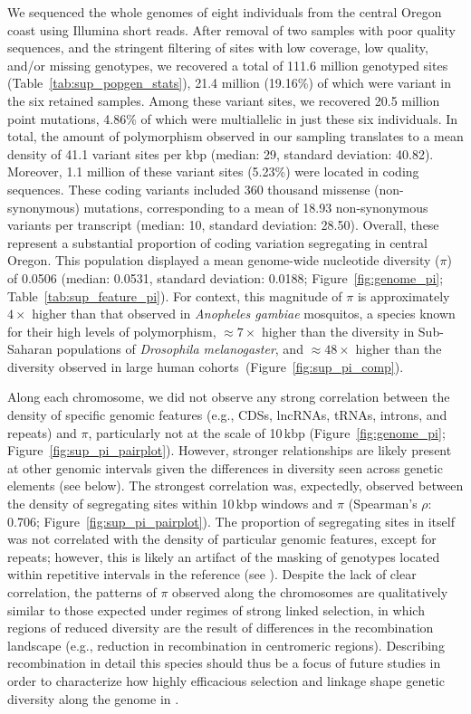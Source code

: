 We sequenced the whole genomes of eight \bgla{} individuals from the central Oregon coast
using Illumina short reads.
After removal of two samples with poor quality sequences, and the stringent filtering of
sites with low coverage, low quality, and/or missing genotypes, we recovered a total of
111.6 million genotyped sites (Table~\ref{tab:sup_popgen_stats}), 21.4 million (19.16\%)
of which were variant in the six retained samples.
Among these variant sites, we recovered 20.5 million point mutations, 4.86\% of which 
were multiallelic in just these six individuals.
In total, the amount of polymorphism observed in our sampling translates to a mean
density of 41.1 variant sites per kbp (median: 29, standard deviation: 40.82).
Moreover, 1.1 million of these variant sites (5.23\%) were located in coding sequences.
These coding variants included 360 thousand missense (non-synonymous) mutations,
corresponding to a mean of 18.93 non-synonymous variants per transcript
(median: 10, standard deviation: 28.50).
Overall, these represent a substantial proportion of coding variation segregating in
central Oregon.
This \bgla{} population displayed a mean genome-wide nucleotide
diversity ($\pi$) of 0.0506 (median: 0.0531, standard deviation: 0.0188;
Figure~\ref{fig:genome_pi}; Table~\ref{tab:sup_feature_pi}).
For context, this magnitude of $\pi$ is approximately $4\times$ higher than that
observed in \textit{Anopheles gambiae} mosquitos, a species known for their high
levels of polymorphism, $\approx7\times$ higher than the diversity in Sub-Saharan
populations of \textit{Drosophila melanogaster}, and $\approx48\times$ higher than the
diversity observed in large human cohorts~(Figure~\ref{fig:sup_pi_comp}).
\vspace{0.1cm}

Along each chromosome, we did not observe any strong correlation between the density
of specific genomic features (e.g., CDSs, lncRNAs, tRNAs, introns, and repeats) and
$\pi$, particularly not at the scale of 10\,kbp (Figure~\ref{fig:genome_pi};
Figure~\ref{fig:sup_pi_pairplot}).
However, stronger relationships are likely present at other genomic intervals given
the differences in diversity seen across genetic elements (see below).
The strongest correlation was, expectedly, observed between the density of segregating sites
within 10\,kbp windows and $\pi$ (Spearman's $\rho$: 0.706; Figure~\ref{fig:sup_pi_pairplot}).
The proportion of segregating sites in itself was not correlated with the density of
particular genomic features, except for repeats; however, this is likely an artifact of the
masking of genotypes located within repetitive intervals in the reference
(see ).
Despite the lack of clear correlation, the patterns of $\pi$ observed along
the chromosomes are qualitatively similar to those expected under regimes of
strong linked selection, in which regions of reduced diversity are the result
of differences in the recombination landscape (e.g., reduction in recombination
in centromeric regions).
Describing recombination in detail this species should thus be a focus of future studies
in order to characterize how highly efficacious selection and linkage shape genetic
diversity along the genome in \bgla{}.
\vspace{0.1cm}


